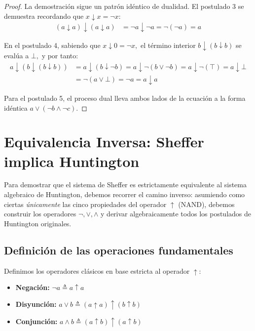 \begin{proof}
La demostración sigue un patrón idéntico de dualidad. El postulado 3 se demuestra recordando que $x \downarrow x = \neg x:$
\begin{align*}
(a \downarrow a) \downarrow (a \downarrow a) &= \neg a \downarrow \neg a = \neg (\neg a) = a
\end{align*}

En el postulado 4, sabiendo que $x \downarrow 0 = \neg x,$ el término interior $b \downarrow (b \downarrow b)$ se evalúa a $\bot,$ y por tanto:
\begin{align*}
a \downarrow (b \downarrow (b \downarrow b)) &= a \downarrow (b \downarrow \neg b) = a \downarrow \neg (b \vee \neg b) = a \downarrow \neg (\top) = a \downarrow \bot \\
&= \neg (a \vee \bot) = \neg a = a \downarrow a
\end{align*}

Para el postulado 5, el proceso dual lleva ambos lados de la ecuación a la forma idéntica $a \vee (\neg b \wedge \neg c).$
\end{proof}

\section{Equivalencia Inversa: Sheffer implica Huntington}

Para demostrar que el sistema de Sheffer es estrictamente equivalente al sistema algebraico de Huntington, debemos recorrer el camino inverso: asumiendo como ciertas \textit{únicamente} las cinco propiedades del operador $\uparrow$ (NAND), debemos construir los operadores $\neg, \vee, \wedge$ y derivar algebraicamente todos los postulados de Huntington originales.

\subsection{Definición de las operaciones fundamentales}
Definimos los operadores clásicos en base estricta al operador $\uparrow:$
\begin{itemize}
    \item \textbf{Negación:} $\neg a \triangleq a \uparrow a$
    \item \textbf{Disyunción:} $a \vee b \triangleq (a \uparrow a) \uparrow (b \uparrow b)$
    \item \textbf{Conjunción:} $a \wedge b \triangleq (a \uparrow b) \uparrow (a \uparrow b)$
\end{itemize}

